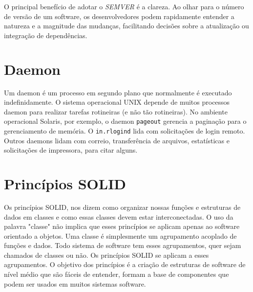 \documentclass[12pt, %
openright, 
oneside, %
a4paper,    %
brazil]{facom-ufu-abntex2}
\begin{document}
O principal benefício de adotar o \textit{SEMVER} é a clareza. Ao olhar para o
número de versão de um software, os desenvolvedores podem rapidamente entender
a natureza e a magnitude das mudanças, facilitando decisões sobre a atualização
ou integração de dependências. \cite{semver}

\section{Daemon}

Um daemon é um processo em segundo plano que normalmente é executado
indefinidamente. O sistema operacional UNIX depende de muitos processos daemon
para realizar tarefas rotineiras (e não tão rotineiras). No ambiente
operacional Solaris, por exemplo, o daemon \texttt{pageout} gerencia a
paginação para o gerenciamento de memória. O \texttt{in.rlogind} lida com
solicitações de login remoto. Outros daemons lidam com correio, transferência
de arquivos, estatísticas e solicitações de impressora, para citar alguns.
\cite{kay2004unix}

\section{Princípios SOLID}

Os princípios SOLID, nos dizem como organizar nossas funções e estruturas de
dados em classes e como essas classes devem estar interconectadas. O uso da
palavra "classe" não implica que esses princípios se aplicam apenas ao software
orientado a objetos. Uma classe é simplesmente um agrupamento acoplado de
funções e dados. Todo sistema de software tem esses agrupamentos, quer sejam
chamados de classes ou não. Os princípios SOLID se aplicam a esses
agrupamentos. O objetivo dos princípios é a criação de estruturas de software
de nível médio que são fáceis de entender, formam a base de componentes que
podem ser usados em muitos sistemas software.
\end{document}
